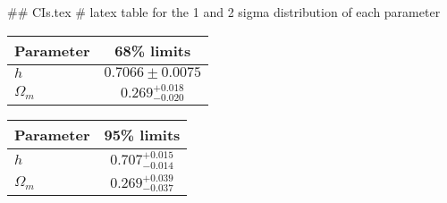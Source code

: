 ## CIs.tex
# latex table for the 1 and 2 sigma distribution of each parameter

\begin{tabular} { l  c}
 Parameter &  68\% limits\\
\hline
{\boldmath$h              $} & $0.7066\pm 0.0075          $\\
{\boldmath$\Omega_m       $} & $0.269^{+0.018}_{-0.020}   $\\
\hline
\end{tabular}

\begin{tabular} { l  c}
 Parameter &  95\% limits\\
\hline
{\boldmath$h              $} & $0.707^{+0.015}_{-0.014}   $\\
{\boldmath$\Omega_m       $} & $0.269^{+0.039}_{-0.037}   $\\
\hline
\end{tabular}
